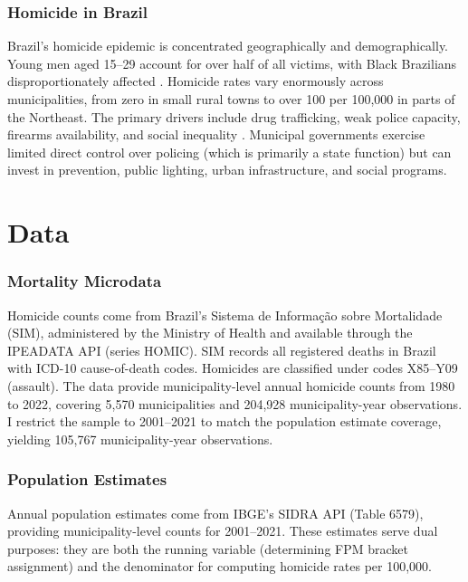 \documentclass[12pt]{article}
\begin{document}
\subsubsection*{Homicide in Brazil} Brazil's homicide epidemic is concentrated geographically and demographically. Young men aged 15--29 account for over half of all victims, with Black Brazilians disproportionately affected \citep{cerqueira2017atlas}. Homicide rates vary enormously across municipalities, from zero in small rural towns to over 100 per 100,000 in parts of the Northeast. The primary drivers include drug trafficking, weak police capacity, firearms availability, and social inequality \citep{soares2006development}. Municipal governments exercise limited direct control over policing (which is primarily a state function) but can invest in prevention, public lighting, urban infrastructure, and social programs.

\section{Data}

\subsubsection*{Mortality Microdata} Homicide counts come from Brazil's Sistema de Informa\c{c}\~{a}o sobre Mortalidade (SIM), administered by the Ministry of Health and available through the IPEADATA API (series HOMIC). SIM records all registered deaths in Brazil with ICD-10 cause-of-death codes. Homicides are classified under codes X85--Y09 (assault). The data provide municipality-level annual homicide counts from 1980 to 2022, covering 5,570 municipalities and 204,928 municipality-year observations. I restrict the sample to 2001--2021 to match the population estimate coverage, yielding 105,767 municipality-year observations.

\subsubsection*{Population Estimates} Annual population estimates come from IBGE's SIDRA API (Table 6579), providing municipality-level counts for 2001--2021. These estimates serve dual purposes: they are both the running variable (determining FPM bracket assignment) and the denominator for computing homicide rates per 100,000.
\end{document}
